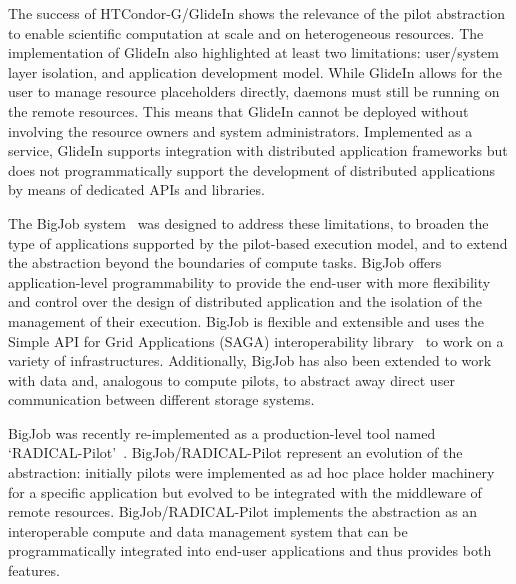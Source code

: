 \documentclass{sig-alternate}
\begin{document}

The success of HTCondor-G/GlideIn shows the relevance of the pilot abstraction
to enable scientific computation at scale and on heterogeneous resources. The
implementation of GlideIn also highlighted at least two limitations: user/system
layer isolation, and application development model. While GlideIn allows for the
user to manage resource placeholders directly, daemons must still be running on
the remote resources. This means that GlideIn cannot be deployed without
involving the resource owners and system administrators. Implemented as a
service, GlideIn supports integration with distributed application frameworks
but does not programmatically support the development of distributed
applications by means of dedicated APIs and libraries.

The BigJob \pilotjob system~\cite{luckow2010} was designed to address these
limitations, to broaden the type of applications supported by the pilot-based
execution model, and to extend the \pilot abstraction beyond the boundaries of
compute tasks.  BigJob offers application-level programmability to provide the
end-user with more flexibility and control over the design of distributed
application and the isolation of the management of their execution. BigJob is
flexible and extensible and uses the Simple API for Grid Applications (SAGA)
interoperability library~\cite{merzky2015saga,goodale2006,luckow2010} to work on
a variety of infrastructures.  Additionally, BigJob has also been extended to
work with data and, analogous to compute pilots, to abstract away direct user
communication between different storage systems.



BigJob was recently re-implemented as a production-level tool named
`RADICAL-Pilot'~\cite{merzky2015radical}. BigJob/RADICAL-Pilot represent an
evolution of the \pilot abstraction: initially pilots were implemented as ad hoc
place holder machinery for a specific application but evolved to be integrated
with the middleware of remote resources. BigJob/RADICAL-Pilot implements the
\pilot abstraction as an interoperable compute and data management system that
can be programmatically integrated into end-user applications and thus provides
both features.
\end{document}
